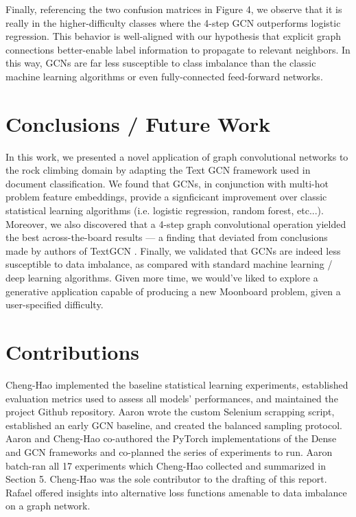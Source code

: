 \documentclass{article}
\begin{document}
Finally, referencing the two confusion matrices in Figure 4, we observe that it is really in the higher-difficulty classes where the 4-step GCN outperforms logistic regression. This behavior is well-aligned with our hypothesis that explicit graph connections better-enable label information to propagate to relevant neighbors. In this way, GCNs are far less susceptible to class imbalance than the classic machine learning algorithms or even fully-connected feed-forward networks.

\section{Conclusions / Future Work}
In this work, we presented a novel application of graph convolutional networks to the rock climbing domain by adapting the Text GCN framework used in document classification. We found that GCNs, in conjunction with multi-hot problem feature embeddings, provide a signficicant improvement over classic statistical learning algorithms (i.e. logistic regression, random forest, etc...). Moreover, we also discovered that a 4-step graph convolutional operation yielded the best across-the-board results --- a finding that deviated from conclusions made by authors of TextGCN \cite{yao2018graph}. Finally, we validated that GCNs are indeed less susceptible to data imbalance, as compared with standard machine learning / deep learning algorithms. Given more time, we would've liked to explore a generative application \cite{mirza2014conditional} capable of producing a new Moonboard problem, given a user-specified difficulty.

\section{Contributions}
Cheng-Hao implemented the baseline statistical learning experiments, established evaluation metrics used to assess all models' performances, and maintained the project Github repository. Aaron wrote the custom Selenium scrapping script, established an early GCN baseline, and created the balanced sampling protocol. Aaron and Cheng-Hao co-authored the PyTorch implementations of the Dense and GCN frameworks and co-planned the series of experiments to run. Aaron batch-ran all 17 experiments which Cheng-Hao collected and summarized in Section 5. Cheng-Hao was the sole contributor to the drafting of this report. Rafael offered insights into alternative loss functions amenable to data imbalance on a graph network.



\end{document}
